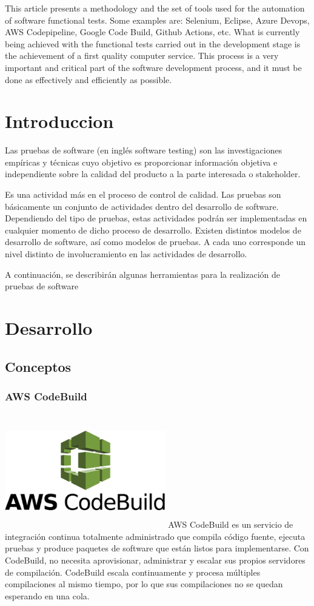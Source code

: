 \documentclass[twoside,twocolumn]{article}
\begin{document}
This article presents a methodology and the set of tools used for the automation of software functional tests. Some examples are: Selenium, Eclipse, Azure Devops, AWS Codepipeline, Google Code Build, Github Actions, etc. What is currently being achieved with the functional tests carried out in the development stage is the achievement of a first quality computer service. This process is a very important and critical part of the software development process, and it must be done as effectively and efficiently as possible.




\section{Introduccion}

Las pruebas de software (en inglés software testing) son las investigaciones empíricas y técnicas cuyo objetivo es proporcionar información objetiva e independiente sobre la calidad del producto a la parte interesada o stakeholder.  

Es una actividad más en el proceso de control de calidad. Las pruebas son básicamente un conjunto de actividades dentro del desarrollo de software. Dependiendo del tipo de pruebas, estas actividades podrán ser implementadas en cualquier momento de dicho proceso de desarrollo. Existen distintos modelos de desarrollo de software, así como modelos de pruebas. A cada uno corresponde un nivel distinto de involucramiento en las actividades de desarrollo.  

A continuación, se describirán algunas herramientas para la realización de pruebas de software 


\section{Desarrollo}
\subsection{Conceptos}
\subsubsection{AWS CodeBuild }
\includegraphics[width=7cm, height=5cm]{imagenes/AWS_CodeBuild.png}
AWS CodeBuild es un servicio de integración continua totalmente administrado que compila código fuente, ejecuta pruebas y produce paquetes de software que están listos para implementarse. Con CodeBuild, no necesita aprovisionar, administrar y escalar sus propios servidores de compilación. CodeBuild escala continuamente y procesa múltiples compilaciones al mismo tiempo, por lo que sus compilaciones no se quedan esperando en una cola. 
\end{document}
